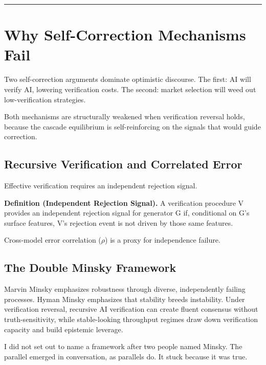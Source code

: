 \documentclass[11pt,a4paper]{article}
\begin{document}
\begin{center}\rule{0.5\linewidth}{0.5pt}\end{center}

\hypertarget{why-self-correction-mechanisms-fail}{%
\section{Why Self-Correction Mechanisms Fail}\label{why-self-correction-mechanisms-fail}}

Two self-correction arguments dominate optimistic discourse. The first: AI will verify AI, lowering verification costs. The second: market selection will weed out low-verification strategies.

Both mechanisms are structurally weakened when verification reversal holds, because the cascade equilibrium is self-reinforcing on the signals that would guide correction.

\hypertarget{recursive-verification-and-correlated-error}{%
\subsection{ Recursive Verification and Correlated Error}\label{recursive-verification-and-correlated-error}}

Effective verification requires an independent rejection signal.

\textbf{Definition (Independent Rejection Signal).} A verification procedure V provides an independent rejection signal for generator G if, conditional on G's surface features, V's rejection event is not driven by those same features.

Cross-model error correlation ($\rho$) is a proxy for independence failure.

\hypertarget{the-double-minsky-framework}{%
\subsection{ The Double Minsky Framework}\label{the-double-minsky-framework}}

Marvin Minsky emphasizes robustness through diverse, independently failing processes. Hyman Minsky emphasizes that stability breeds instability. Under verification reversal, recursive AI verification can create fluent consensus without truth-sensitivity, while stable-looking throughput regimes draw down verification capacity and build epistemic leverage.

I did not set out to name a framework after two people named Minsky. The parallel emerged in conversation, as parallels do. It stuck because it was true.
\end{document}
